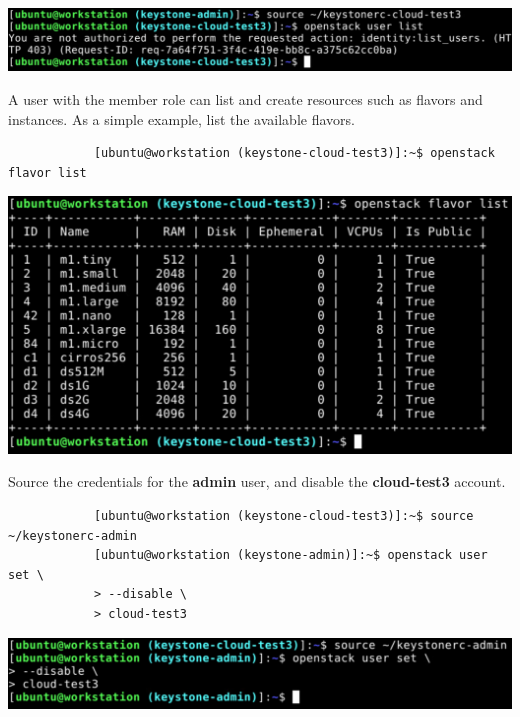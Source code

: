 \documentclass[letterpaper, 12pt]{article}
\begin{document}
\begin{enumerate}
\begin{labstep}
        \begin{center}
            \includegraphics[width=\linewidth]{images/part4/step11.png}
        \end{center}
    \end{labstep}

    \begin{labstep}
        A user with the member role can list and create resources such as flavors and instances.
        As a simple example, list the available flavors.
        \begin{lstlisting}
            [ubuntu@workstation (keystone-cloud-test3)]:~$ openstack flavor list
        \end{lstlisting}

        \begin{center}
            \includegraphics[width=\linewidth]{images/part4/step12.png}
        \end{center}
    \end{labstep}

    \begin{labstep}
        Source the credentials for the \textbf{admin} user, and disable the \textbf{cloud-test3} account.
        \begin{lstlisting}
            [ubuntu@workstation (keystone-cloud-test3)]:~$ source ~/keystonerc-admin
            [ubuntu@workstation (keystone-admin)]:~$ openstack user set \
            > --disable \
            > cloud-test3
        \end{lstlisting}

        \begin{center}
            \includegraphics[width=\linewidth]{images/part4/step13.png}
        \end{center}
    \end{labstep}


\end{enumerate}
\end{document}
